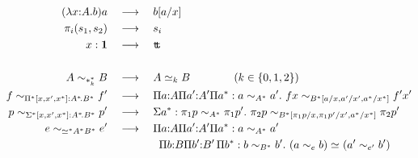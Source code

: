 \documentclass[12pt]{scrartcl}
\newcommand{\unitt}{{\boldsymbol{1}}}
\begin{document}
\begin{align*}
  (\lambda x{:}A.b)a &\rrule b[a/x]\\
  \pi_i(s_1,s_2) &\rrule s_i\\
  x : \unitt &\rrule \ttt\\
\\
    A \sim_{\sta^*_k} B &\rrule A \ee{k} B\qquad\qquad (k \in \setof{0,1,2})\\
    f \sim_{\Pi^* [x,x',x^*] : A^*\!. B^*} f' &\rrule \Pi a{:}A \Pi a'{:}A' \Pi a^* : a
    \sim_{A^*} a'.\ f x \sim_{B^*[a/x,a'/x',a^*/x^*]} f' x'\\
    p \sim_{\Sigma^* [x,x',x^*] : A^*\!. B^*} p' &\rrule \Sigma a^* : \pi_1 p \sim_{A^*}
    \pi_1 p'.\ \pi_2 p \sim_{B^*[\pi_1 p/x, \pi_1 p'/x', a^*/x^*]}
    \pi_2 p'\\
    e \sim_{\ee{}^* A^* B^*} e' &\rrule \Pi a {:}A \Pi a'{:}A' \Pi a^* : a
    \sim_{A^*} a'\\
    &\hspace{1.65cm} \Pi b{:}B \Pi b'{:}B' \,\Pi b^* : b \sim_{B^*}
    b'.\ (a \sim_e b) \ee{} (a' \sim_{e'} b')
\end{align*}
\end{document}
